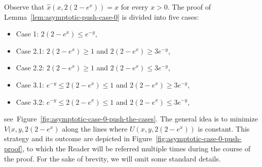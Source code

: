 \documentclass[a4paper]{amsart} %
\theoremstyle{definition}
\theoremstyle{remark}
\numberwithin{equation}{section}
\newcommand*{\xGain}{\hat{x}}
\newcommand*{\XXXasymptoticDenominator}{V}
\newcommand*{\XXXasymptoticNominator}{U}
\begin{document}
	Observe that $\xGain(x,2(2-e^x)) = x$ for every $x>0$.
	The proof of Lemma~\ref{lem:asymptotic-push-case-0} is divided into five cases:
	\begin{itemize}
		\item Case 1: $2(2-e^x) \leq e^{-y}$,
		\item Case 2.1: $2(2-e^x) \geq 1$ and $2(2-e^x) \geq 3e^{-y}$,
		\item Case 2.2: $2(2-e^x) \geq 1$ and $2(2-e^x) \leq 3e^{-y}$,
		\item Case 3.1: $e^{-y} \leq 2(2-e^x) \leq 1$ and $2(2-e^x) \geq 3e^{-y}$,
		\item Case 3.2: $e^{-y} \leq 2(2-e^x) \leq 1$ and $2(2-e^x) \leq 3e^{-y}$,
	\end{itemize}
	see~Figure~\ref{fig:asymptotic-case-0-push-the-cases}.
	The general idea is to minimize $\XXXasymptoticDenominator(x, y, 2(2-e^x)$
	along the lines where $\XXXasymptoticNominator(x, y, 2(2-e^x))$ is constant.
	This strategy and its outcome are depicted in Figure~\ref{fig:asymptotic-case-0-push-proof}, to which the Reader will be referred multiple times during the course of the proof.	
	For the sake of brevity, we will omit some standard details.	
	
\end{document}
